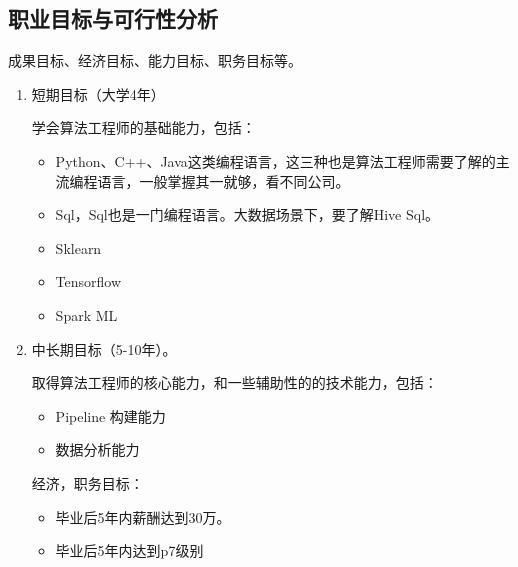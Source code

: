 \documentclass{article}
\begin{document}
\subsection{职业目标与可行性分析}
\par
成果目标、经济目标、能力目标、职务目标等。\par 
\begin{enumerate}[(1)]
	\item 短期目标（大学4年）\par
     学会算法工程师的基础能力，包括：
\begin{itemize}
    \item Python、C++、Java这类编程语言，这三种也是算法工程师需要了解的主流编程语言，一般掌握其一就够，看不同公司。
    \item Sql，Sql也是一门编程语言。大数据场景下，要了解Hive Sql。
    \item Sklearn
    \item Tensorflow
    \item Spark ML
\end{itemize}
	\item 中长期目标（5-10年）。\par
 	取得算法工程师的核心能力，和一些辅助性的的技术能力，包括：
\begin{itemize}
    \item Pipeline 构建能力
    \item 数据分析能力
\end{itemize}
	经济，职务目标：
\begin{itemize}
    \item 毕业后5年内薪酬达到30万。
    \item 毕业后5年内达到p7级别
\end{itemize}	

	
\end{enumerate}
\end{document}
